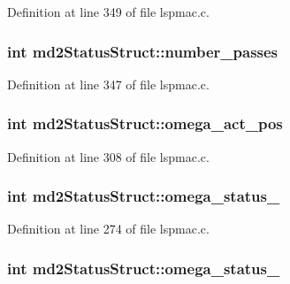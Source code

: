 Definition at line 349 of file lspmac.\-c.

\hypertarget{structmd2StatusStruct_ab3da523bad7b82c1d27780caa24a8b92}{
\subsubsection[{number\-\_\-passes}]{\setlength{\rightskip}{0pt plus 5cm}int md2\-Status\-Struct\-::number\-\_\-passes}}\label{structmd2StatusStruct_ab3da523bad7b82c1d27780caa24a8b92}


Definition at line 347 of file lspmac.\-c.

\hypertarget{structmd2StatusStruct_a6ce303bec89082cae1e9b1fddf6b6c10}{
\subsubsection[{omega\-\_\-act\-\_\-pos}]{\setlength{\rightskip}{0pt plus 5cm}int md2\-Status\-Struct\-::omega\-\_\-act\-\_\-pos}}\label{structmd2StatusStruct_a6ce303bec89082cae1e9b1fddf6b6c10}


Definition at line 308 of file lspmac.\-c.

\hypertarget{structmd2StatusStruct_af6cf3cd65b9ef205685a0d970f168907}{
\subsubsection[{omega\-\_\-status\-\_\-1}]{\setlength{\rightskip}{0pt plus 5cm}int md2\-Status\-Struct\-::omega\-\_\-status\-\_}}\label{structmd2StatusStruct_af6cf3cd65b9ef205685a0d970f168907}


Definition at line 274 of file lspmac.\-c.

\hypertarget{structmd2StatusStruct_a8577c9df7b663b548b2759ac3db721cd}{
\subsubsection[{omega\-\_\-status\-\_\-2}]{\setlength{\rightskip}{0pt plus 5cm}int md2\-Status\-Struct\-::omega\-\_\-status\-\_}}\label{structmd2StatusStruct_a8577c9df7b663b548b2759ac3db721cd}


